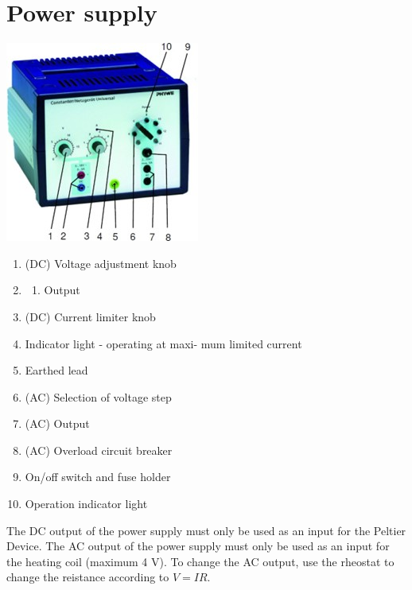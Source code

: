 \documentclass[
  letterpaper,
  DIV=11,
  numbers=noendperiod]{scrreprt}
\providecommand{\tightlist}{%
  \setlength{\itemsep}{0pt}\setlength{\parskip}{0pt}}\usepackage{longtable,booktabs,array}
\begin{document}
\hypertarget{power-supply}{%
\section{Power supply}\label{power-supply}}

\includegraphics{./images/PowerSupply.jpg}

\begin{enumerate}
\def\labelenumi{\arabic{enumi}.}
\item
  (DC) Voltage adjustment knob
\item
  \begin{enumerate}
  \def\labelenumii{(\Roman{enumii})}
  \setcounter{enumii}{599}
  \tightlist
  \item
    Output
  \end{enumerate}
\item
  (DC) Current limiter knob
\item
  Indicator light - operating at maxi- mum limited current
\item
  Earthed lead
\item
  (AC) Selection of voltage step
\item
  (AC) Output
\item
  (AC) Overload circuit breaker
\item
  On/off switch and fuse holder
\item
  Operation indicator light
\end{enumerate}

\begin{tcolorbox}[enhanced jigsaw, toprule=.15mm, coltitle=black, bottomrule=.15mm, colbacktitle=quarto-callout-important-color!10!white, opacitybacktitle=0.6, titlerule=0mm, colframe=quarto-callout-important-color-frame, title=\textcolor{quarto-callout-important-color}{\faExclamation}\hspace{0.5em}{Warning}, leftrule=.75mm, bottomtitle=1mm, breakable, opacityback=0, arc=.35mm, left=2mm, colback=white, rightrule=.15mm, toptitle=1mm]

The DC output of the power supply must only be used as an input for the
Peltier Device. The AC output of the power supply must only be used as
an input for the heating coil (maximum 4 V). To change the AC output,
use the rheostat to change the reistance according to \(V=IR%
\).

\end{tcolorbox}
\end{document}
